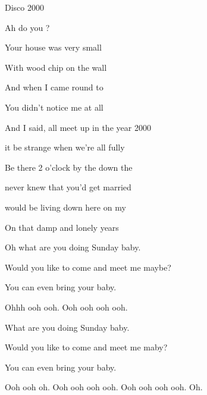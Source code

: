 \begin{song}{Disco 2000}{
	
	\chordset[Intro]{ \FMaj \FMajsusFour \BMaj \BMajsusFour }	
	
	\chordset[Verse]{ \FMaj \BFlat }

	\chordset[Chorus]{ \Cm \BFlat \Dm \Gm \FMaj }
	
}
\begin{songverse}
		Ah do you ?

		Your house was very small

		With wood chip on the wall
                         
		And when I came round to 

		You didn't notice me at all 		
	 \end{songverse}

	\begin{songverse}
	
		And I said,  all meet up in the year 2000
                                        
		 it be strange when we're all fully 
                                          
		Be there 2 o'clock by the  down the 

		 never knew that you'd get married 
                             
		 would be living down here on my    

		On that damp and lonely  years  
		
		Oh what are you doing Sunday baby.
		
		Would you like to come and meet me maybe?
		
		You can even bring your baby.
		
		Ohhh ooh ooh. Ooh ooh ooh ooh.
		
		What are you doing Sunday baby.
		
		Would you like to come and meet me maby?
		
		You can even bring your baby.
		
		Ooh ooh oh. Ooh ooh ooh ooh. Ooh ooh ooh ooh. Oh. 
	 \end{songverse}

\end{song}